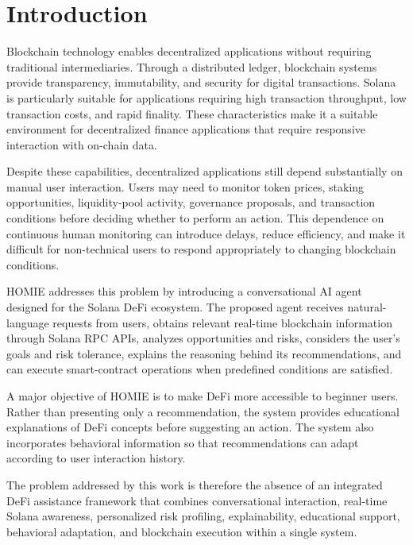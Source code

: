 \documentclass[conference]{IEEEtran}
\begin{document}
\section{Introduction}

Blockchain technology enables decentralized applications without requiring traditional intermediaries. Through a distributed ledger, blockchain systems provide transparency, immutability, and security for digital transactions. Solana is particularly suitable for applications requiring high transaction throughput, low transaction costs, and rapid finality. These characteristics make it a suitable environment for decentralized finance applications that require responsive interaction with on-chain data.

Despite these capabilities, decentralized applications still depend substantially on manual user interaction. Users may need to monitor token prices, staking opportunities, liquidity-pool activity, governance proposals, and transaction conditions before deciding whether to perform an action. This dependence on continuous human monitoring can introduce delays, reduce efficiency, and make it difficult for non-technical users to respond appropriately to changing blockchain conditions.

HOMIE addresses this problem by introducing a conversational AI agent designed for the Solana DeFi ecosystem. The proposed agent receives natural-language requests from users, obtains relevant real-time blockchain information through Solana RPC APIs, analyzes opportunities and risks, considers the user's goals and risk tolerance, explains the reasoning behind its recommendations, and can execute smart-contract operations when predefined conditions are satisfied.

A major objective of HOMIE is to make DeFi more accessible to beginner users. Rather than presenting only a recommendation, the system provides educational explanations of DeFi concepts before suggesting an action. The system also incorporates behavioral information so that recommendations can adapt according to user interaction history.

The problem addressed by this work is therefore the absence of an integrated DeFi assistance framework that combines conversational interaction, real-time Solana awareness, personalized risk profiling, explainability, educational support, behavioral adaptation, and blockchain execution within a single system.
\end{document}
